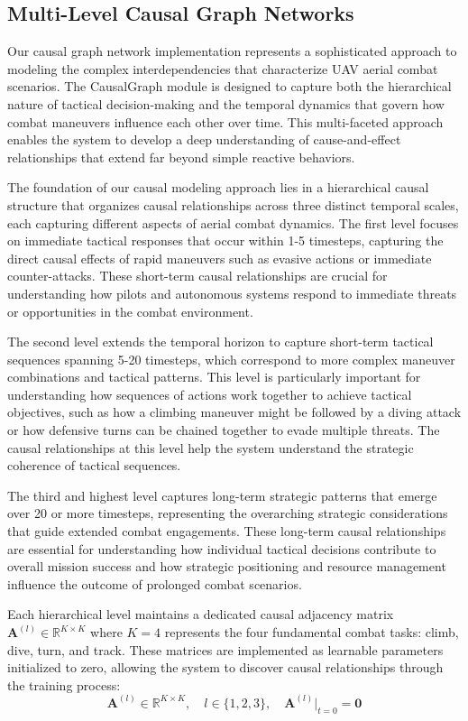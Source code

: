 \documentclass[12pt]{article}
\begin{document}
\subsection{Multi-Level Causal Graph Networks}

Our causal graph network implementation represents a sophisticated approach to modeling the complex interdependencies that characterize UAV aerial combat scenarios. The CausalGraph module is designed to capture both the hierarchical nature of tactical decision-making and the temporal dynamics that govern how combat maneuvers influence each other over time. This multi-faceted approach enables the system to develop a deep understanding of cause-and-effect relationships that extend far beyond simple reactive behaviors.

The foundation of our causal modeling approach lies in a hierarchical causal structure that organizes causal relationships across three distinct temporal scales, each capturing different aspects of aerial combat dynamics. The first level focuses on immediate tactical responses that occur within 1-5 timesteps, capturing the direct causal effects of rapid maneuvers such as evasive actions or immediate counter-attacks. These short-term causal relationships are crucial for understanding how pilots and autonomous systems respond to immediate threats or opportunities in the combat environment.

The second level extends the temporal horizon to capture short-term tactical sequences spanning 5-20 timesteps, which correspond to more complex maneuver combinations and tactical patterns. This level is particularly important for understanding how sequences of actions work together to achieve tactical objectives, such as how a climbing maneuver might be followed by a diving attack or how defensive turns can be chained together to evade multiple threats. The causal relationships at this level help the system understand the strategic coherence of tactical sequences.

The third and highest level captures long-term strategic patterns that emerge over 20 or more timesteps, representing the overarching strategic considerations that guide extended combat engagements. These long-term causal relationships are essential for understanding how individual tactical decisions contribute to overall mission success and how strategic positioning and resource management influence the outcome of prolonged combat scenarios.

Each hierarchical level maintains a dedicated causal adjacency matrix $\mathbf{A}^{(l)} \in \mathbb{R}^{K \times K}$ where $K=4$ represents the four fundamental combat tasks: climb, dive, turn, and track. These matrices are implemented as learnable parameters initialized to zero, allowing the system to discover causal relationships through the training process:
\begin{equation}
\mathbf{A}^{(l)} \in \mathbb{R}^{K\times K},\quad l\in\{1,2,3\},\quad \mathbf{A}^{(l)}\big|_{t=0}=\mathbf{0}
\end{equation}
\end{document}
